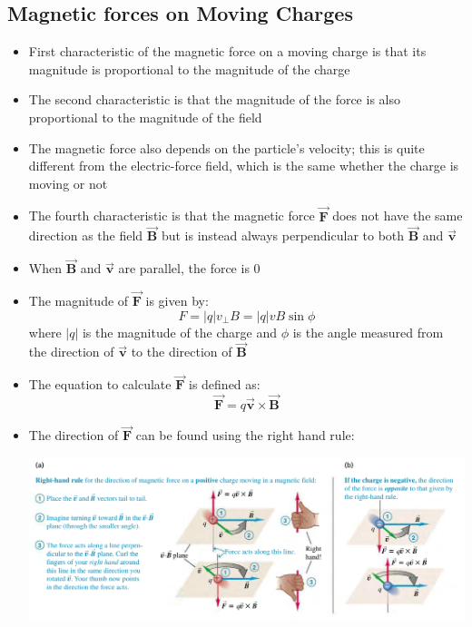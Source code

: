 \documentclass[11pt, a4paper]{article}
\begin{document}
\subsection{Magnetic forces on Moving Charges}
\begin{itemize}
    \item First characteristic of the magnetic force on a moving charge is that its
        magnitude is proportional to the magnitude of the charge
    \item The second characteristic is that the magnitude of the force is also
        proportional to the magnitude of the field
    \item The magnetic force also depends on the particle's velocity; this is quite
        different from the electric-force field, which is the same whether the charge is
        moving or not
    \item The fourth characteristic is that the magnetic force $\vec{\mathbf{F}}$ does
        not have the same direction as the field $\vec{\mathbf{B}}$ but is instead always
        perpendicular to both $\vec{\mathbf{B}}$ and $\vec{\mathbf{v}}$
    \item When $\vec{\mathbf{B}}$ and $\vec{\mathbf{v}}$ are parallel, the force is $0$
    \item The magnitude of $\vec{\mathbf{F}}$ is given by:
        \begin{equation}
            F = |q|v_{\perp}B = |q|vB\sin\phi
        \end{equation}
        where $|q|$ is the magnitude of the charge and $\phi$ is the angle measured from
        the direction of $\vec{\mathbf{v}}$ to the direction of $\vec{\mathbf{B}}$
    \item The equation to calculate $\vec{\mathbf{F}}$ is defined as:
        \begin{equation}
            \vec{\mathbf{F}} = q\vec{\mathbf{v}} \times \vec{\mathbf{B}}
        \end{equation}
    \item The direction of $\vec{\mathbf{F}}$ can be found using the right hand rule:

    \includegraphics[scale=0.50]{images/right_hand_rule.png}

\end{itemize}
\end{document}
